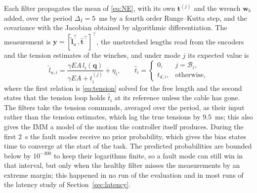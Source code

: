 \documentclass[a4paper,fleqn]{cas-dc}
\newcommand{\vc}[1]{\bm{#1}}
\begin{document}
Each filter propagates the mean of \eqref{eq:NE}, with its own $\vc t^{(j)}$ and the wrench $\vc w_b$ added, over the period $\Delta_I=5$~ms by a fourth order Runge--Kutta step, and the covariance with the Jacobian obtained by algorithmic differentiation. The measurement is $\vc y=[\tilde{\vc l}_u^\top,\hat{\vc t}^\top]^\top$, the unstretched lengths read from the encoders and the tension estimates of the winches, and under mode $j$ its expected value is
\begin{equation}\label{eq:h}
\tilde l_{u,i}=\frac{\gamma EA\,l_i(\vc q)}{\gamma EA+t_i^{(j)}}+\eta_i,\qquad
\hat t_i=\begin{cases}0,&j=\mathcal B_i,\\ t_{d,i},&\text{otherwise},\end{cases}
\end{equation}
where the first relation is \eqref{eq:tension} solved for the free length and the second states that the tension loop holds $\hat t_i$ at its reference unless the cable has gone. The filters take the tension commands, averaged over the period, as their input rather than the tension estimates, which lag the true tensions by 9.5~ms; this also gives the IMM a model of the motion the controller itself produces. During the first 2~s the fault modes receive no prior probability, which gives the bias states time to converge at the start of the task. The predicted probabilities are bounded below by $10^{-300}$ to keep their logarithms finite, so a fault mode can still win in that interval, but only when the healthy filter misses the measurements by an extreme margin; this happened in no run of the evaluation and in most runs of the latency study of Section~\ref{sec:latency}.
\end{document}
